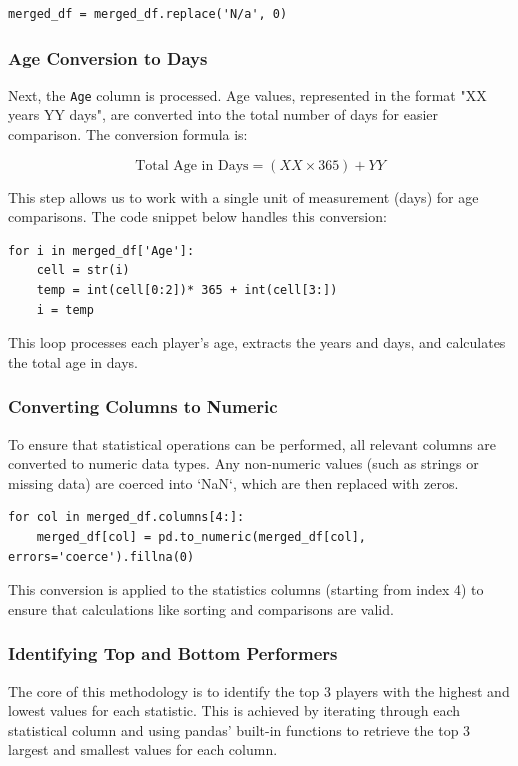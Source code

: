 \documentclass[a4paper,12pt]{article}
\begin{document}
\begin{verbatim}
merged_df = merged_df.replace('N/a', 0)
\end{verbatim}

\subsubsection{Age Conversion to Days}

Next, the \texttt{Age} column is processed. Age values, represented in the format "XX years YY days", are converted into the total number of days for easier comparison. The conversion formula is:

\[
\text{Total Age in Days} = (XX \times 365) + YY
\]

This step allows us to work with a single unit of measurement (days) for age comparisons. The code snippet below handles this conversion:

\begin{verbatim}
for i in merged_df['Age']:
    cell = str(i)
    temp = int(cell[0:2])* 365 + int(cell[3:])
    i = temp
\end{verbatim}

This loop processes each player's age, extracts the years and days, and calculates the total age in days.

\subsubsection{Converting Columns to Numeric}

To ensure that statistical operations can be performed, all relevant columns are converted to numeric data types. Any non-numeric values (such as strings or missing data) are coerced into `NaN`, which are then replaced with zeros.

\begin{verbatim}
for col in merged_df.columns[4:]:
    merged_df[col] = pd.to_numeric(merged_df[col], errors='coerce').fillna(0)
\end{verbatim}

This conversion is applied to the statistics columns (starting from index 4) to ensure that calculations like sorting and comparisons are valid.

\subsubsection{Identifying Top and Bottom Performers}

The core of this methodology is to identify the top 3 players with the highest and lowest values for each statistic. This is achieved by iterating through each statistical column and using pandas' built-in functions to retrieve the top 3 largest and smallest values for each column.
\end{document}
